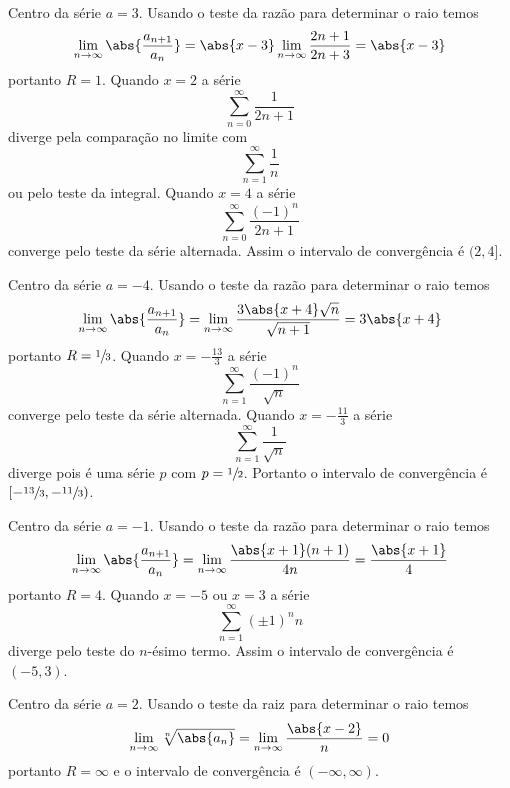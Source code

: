 \begin{exercises}
\begin{exercise}
\begin{answer}
\begin{alphalist}
  \item Centro da série $a=3$.
  Usando o teste da razão para determinar o raio temos
  \[
    \lim_{n\to\infty}\abs{\frac{a_{n+1}}{a_n}} =
    \abs{x-3} \lim_{n\to\infty} \frac{2n+1}{2n+3} =
    \abs{x-3}
  \]
  portanto $R=1$.
  Quando $x=2$ a série
  \[
    \sum_{n=0}^{\infty} \frac{1}{2n+1}
  \]
  diverge pela comparação no limite com
  \[
    \sum_{n=1}^{\infty}\frac{1}{n}
  \]
  ou pelo teste da integral.
  Quando $x=4$ a série
  \[
    \sum_{n=0}^{\infty} \frac{(-1)^n}{2n+1}
  \]
  converge pelo teste da série alternada.
  Assim o intervalo de convergência é $(2, 4]$.

  \item Centro da série $a=-4$.
  Usando o teste da razão para determinar o raio temos
  \[
    \lim_{n\to\infty}\abs{\frac{a_{n+1}}{a_n}} =
    \lim_{n\to\infty} \frac{3\abs{x+4}\sqrt{n}}{\sqrt{n+1}} =
    3\abs{x+4}
  \]
  portanto $R=\sfrac{1}{3}$.
  Quando $x=-\frac{13}{3}$ a série
  \[
    \sum_{n=1}^{\infty} \frac{(-1)^n}{\sqrt{n}}
  \]
  converge pelo teste da série alternada.
  Quando $x=-\frac{11}{3}$ a série
  \[
    \sum_{n=1}^{\infty} \frac{1}{\sqrt{n}}
  \]
  diverge pois é uma série $p$ com $p=\sfrac{1}{2}$.
  Portanto o intervalo de convergência é $\left[-\sfrac{13}{3}, -\sfrac{11}{3}\right)$.

  \item Centro da série $a=-1$.
  Usando o teste da razão para determinar o raio temos
  \[
    \lim_{n\to\infty} \abs{\frac{a_{n+1}}{a_n}} =
    \lim_{n\to\infty} \frac{\abs{x+1}(n+1)}{4n} =
    \frac{\abs{x+1}}{4}
    \]
  portanto $R=4$.
  Quando $x=-5$ ou $x= 3$ a série
  \[
    \sum_{n=1}^{\infty} (\pm 1)^n n
  \]
  diverge pelo teste do $n$-ésimo termo.
  Assim o intervalo de convergência é $\left(-5, 3\right)$.

  \item Centro da série $a=2$.
  Usando o teste da raiz para determinar o raio temos
  \[
    \lim_{n\to\infty} \sqrt[n]{\abs{a_n}} =
    \lim_{n\to\infty} \frac{\abs{x-2}}{n} = 0
  \]
  portanto $R=\infty$ e o intervalo de convergência é $\left(-\infty, \infty\right)$.


\end{alphalist}
\end{answer}
\end{exercise}
\end{exercises}
